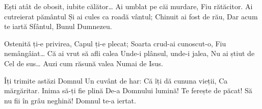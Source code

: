 \beginverse
Ești atât de obosit, iubite călător…
Ai umblat pe căi murdare,
Fiu rătăcitor.
Ai cutreierat pământul
Și ai cules ca roadă vântul;
Chinuit ai fost de rău,
Dar acum te iartă Sfântul,
Bunul Dumnezeu.
\endverse

\beginverse
Ostenită ți-e privirea,
Capul ți-e plecat;
Soarta crud-ai cunoscut-o,
Fiu nemângâiat…
Că ai vrut să afli calea
Unde-i plânsul, unde-i jalea,
Nu ai știut de Cel de sus…
Auzi cum răsună valea
Numai de Isus.
\endverse

\beginverse
Îți trimite astăzi Domnul
Un cuvânt de har:
Că îți dă cununa vieții,
Ca mărgăritar.
Inima să-ți fie plină
De-a Domnului lumină!
Te ferește de păcat!
Să nu fii în grâu neghină!
Domnul te-a iertat.
\endverse
\endsong